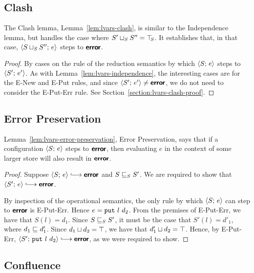 \subsection{Clash}

The Clash lemma, Lemma~\ref{lem:lvars-clash}, is similar to the
Independence lemma, but handles the case where $S' \sqcup_{S} S'' =
\top\hspace{-0.85mm}_{S}$.  It establishes that, in that case,
$\langle S \sqcup_{S} S'';\, e \rangle$ steps to $\textbf{\textsf{error}}$.

\LVarsLemClash
\begin{proof}
  By cases on the rule of the reduction semantics by which
  $\langle S;\, e \rangle$ steps to $\langle S';\, e' \rangle$. As with
  Lemma~\ref{lem:lvars-independence}, the interesting cases are for
  the {\sc E-New} and {\sc E-Put} rules, and since $\langle S';\, e' \rangle
  \neq \textbf{\textsf{error}}$, we do not need to consider the {\sc E-Put-Err} rule.
  See Section~\ref{section:lvars-clash-proof}.
\end{proof}

\subsection{Error Preservation}

Lemma~\ref{lem:lvars-error-preservation}, Error Preservation, says
that if a configuration $\langle S;\, e \rangle$ steps to $\textbf{\textsf{error}}$, then
evaluating $e$ in the context of some larger store will also result in
$\textbf{\textsf{error}}$.

\LVarsLemErrorPreservation
\begin{proof}
  Suppose $\config{S}{e} \parstepsto \error$ and
  $S \sqsubseteq_S S'$. We are required to show that $\config{S'}{e}
  \parstepsto \error$.

  By inspection of the operational semantics, the only rule by which
  $\langle S;\, e \rangle$ can step to $\textbf{\textsf{error}}$ is {\sc E-Put-Err}.  Hence $e =
  \mbox{\texttt{put}}~l~d_2$.  From the premises of {\sc E-Put-Err}, we have
  that $S(l) = d_1$.  Since $S \sqsubseteq_S S'$, it must be the case
  that $S'(l) = d'_1$, where $d_1 \sqsubseteq d'_1$.  Since
  $d_1 \sqcup d_2 = \top$, we have that $d'_1 \sqcup d_2 =
  \top$.  Hence, by {\sc E-Put-Err}, $\config{S'}{\putexp{l}{d_2}}
  \parstepsto \error$, as we were required to show.
\end{proof}

\subsection{Confluence}\label{subsection:lvars-confluence}

